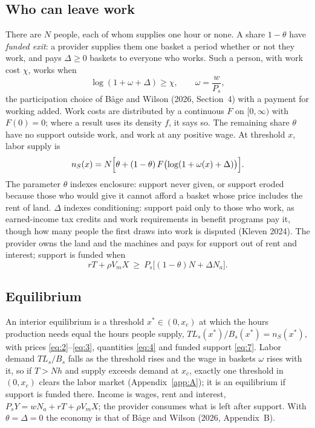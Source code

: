 \documentclass[12pt]{article}
\theoremstyle{plain}
\begin{document}
\subsection{Who can leave work}\label{sec:3.2}

There are $N$ people, each of whom supplies one hour or none. A share $1-\theta$ have \emph{funded exit}: a provider supplies them one basket a period whether or not they work, and pays $\Delta\ge0$ baskets to everyone who works. Such a person, with work cost $\chi$, works when
\begin{equation}\label{eq:5}
\log(1+\omega+\Delta)\ge\chi,\qquad \omega=\frac{w}{P_s},
\end{equation}
the participation choice of B\r{a}ge and Wilson (2026, Section~4) with a payment for working added. Work costs are distributed by a continuous $F$ on $[0,\infty)$ with $F(0)=0$; where a result uses its density $f$, it says so. The remaining share $\theta$ have no support outside work, and work at any positive wage. At threshold $x$, labor supply is
\begin{equation}\label{eq:6}
n_S(x)=N\Bigl[\theta+(1-\theta)\,F\bigl(\log(1+\omega(x)+\Delta)\bigr)\Bigr].
\end{equation}
The parameter $\theta$ indexes enclosure: support never given, or support eroded because those who would give it cannot afford a basket whose price includes the rent of land. $\Delta$ indexes conditioning: support paid only to those who work, as earned-income tax credits and work requirements in benefit programs pay it, though how many people the first draws into work is disputed (Kleven 2024). The provider owns the land and the machines and pays for support out of rent and interest; support is funded when
\begin{equation}\label{eq:7}
rT+\rho V_mX\ \ge\ P_s\bigl[(1-\theta)N+\Delta N_a\bigr].
\end{equation}

\subsection{Equilibrium}\label{sec:3.3}

An interior equilibrium is a threshold $x^*\in(0,x_c)$ at which the hours production needs equal the hours people supply, $T L_s(x^*)/B_s(x^*)=n_S(x^*)$, with prices \eqref{eq:2}--\eqref{eq:3}, quantities \eqref{eq:4} and funded support \eqref{eq:7}. Labor demand $TL_s/B_s$ falls as the threshold rises and the wage in baskets $\omega$ rises with it, so if $T>Nh$ and supply exceeds demand at $x_c$, exactly one threshold in $(0,x_c)$ clears the labor market (Appendix~\ref{app:A}); it is an equilibrium if support is funded there. Income is wages, rent and interest, $P_sY=wN_a+rT+\rho V_mX$; the provider consumes what is left after support. With $\theta=\Delta=0$ the economy is that of B\r{a}ge and Wilson (2026, Appendix~B).
\end{document}
